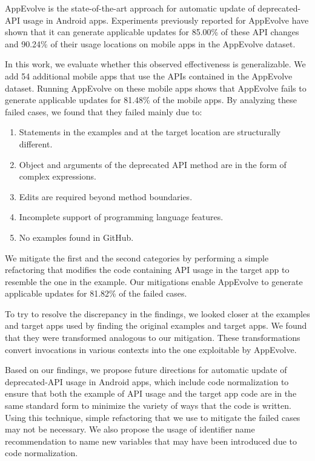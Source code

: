 AppEvolve is the state-of-the-art approach for automatic update of
deprecated-API usage in Android apps. Experiments previously reported for
AppEvolve have shown that it can generate applicable updates for
85.00\% of these API
changes and 90.24\% of their usage locations on mobile apps in the
AppEvolve dataset.

In this work, we evaluate whether this observed effectiveness is
generalizable. We add 54 additional mobile apps that use the APIs contained
in the AppEvolve dataset. Running AppEvolve on these mobile apps shows that
AppEvolve fails to generate applicable updates for 81.48\% of the mobile
apps. By analyzing these failed cases, we found that they failed mainly
due to:
\begin{enumerate}
    \item Statements in the examples and at the target location are structurally different.
    \item Object and arguments of the deprecated API method are in the form of complex expressions.
    \item Edits are required beyond method boundaries.
    \item Incomplete support of programming language features.
    \item No examples found in GitHub.
\end{enumerate}
We mitigate the first and the second categories by performing a simple
refactoring that modifies the code containing API usage in the target app
to resemble the one in the example. Our mitigations enable AppEvolve
to generate applicable updates for 81.82\% of the failed cases.

To try to resolve the discrepancy in the findings, we looked closer at the examples and target apps used by finding the original examples and target apps. We found that they were  transformed analogous to our mitigation.  These transformations convert invocations in various contexts into the one exploitable by AppEvolve.

Based on our findings, we propose future directions for automatic update of deprecated-API usage in Android apps, which include code normalization to ensure that both the example of API usage and the target app code are in the same standard form to minimize the variety of ways that the code is written. Using this technique, simple refactoring that we use to mitigate the failed cases may not be necessary. We also propose the usage of identifier name recommendation to name new variables that may have been introduced due to code normalization.

